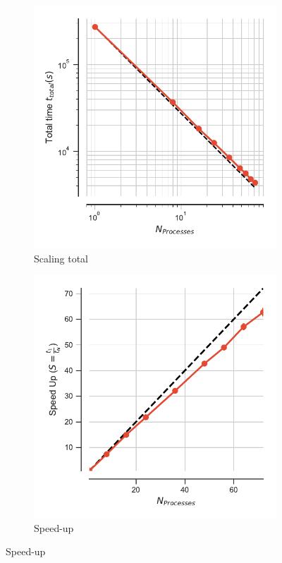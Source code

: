 \begin{figure}
\centering
\begin{subfigure}{.4\textwidth}
  \includegraphics[width=\linewidth]{figures/main-dihedral-t_total.pdf}
  \caption{Scaling total}
  \label{fig:MPIscaling-dihed}
\end{subfigure}
\hfill
\begin{subfigure}{.4\textwidth}
  \includegraphics[width=\linewidth]{figures/main-dihedral-speed_up.pdf}
  \caption{Speed-up}
  \label{fig:MPIspeedup-dihed}
\end{subfigure}
\bigskip


\end{figure}
